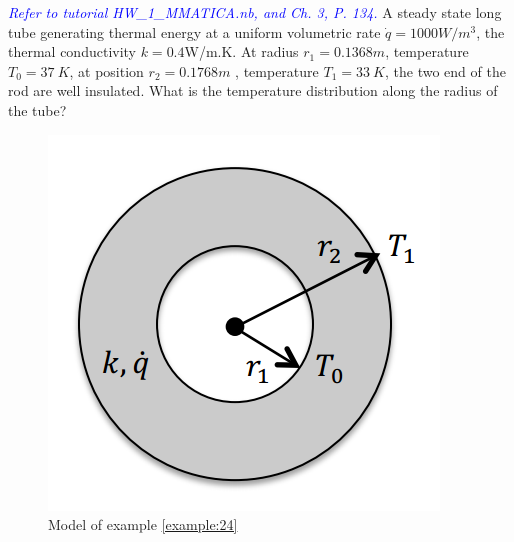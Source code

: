\begin{example}
\label{example:24}
\textcolor{blue} {\emph{Refer to tutorial HW\_1\_MMATICA.nb, and Ch. 3, P. 134.}}
A steady state long tube generating thermal energy at a uniform volumetric rate
$\dot{q}=1000W/m^3$, the thermal conductivity $k=0.4$W/m.K.
At radius $r_1=0.1368m$, temperature $T_0=37~K$, at position $r_2=0.1768m$
, temperature $T_1=33~K$, the two end of the rod are well insulated.
What is the temperature distribution along the radius of the tube?
\begin{figure}[H]
  \centering
    \includegraphics[scale=0.6]{figures/ch2/8}
    \caption{Model of example \ref{example:24}}
    \label{fig:2:8}
\end{figure}
\end{example}

